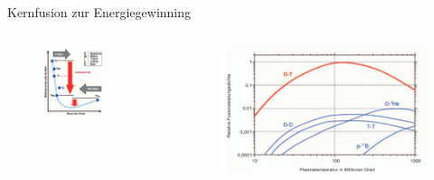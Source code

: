 \documentclass[aspectratio=169,xcolor=dvipsnames,14pt]{beamer}
\begin{document}
\begin{frame}{Kernfusion zur Energiegewinning}
    \begin{columns}
        \begin{column}{0.5\textwidth}
            \begin{figure}
                \centering
                \includegraphics[width=0.7\textwidth]{Images/Bindungsenergie.png}
            \end{figure}
        \end{column}

        \begin{column}{0.5\textwidth}
            \begin{figure}
                \centering
                \includegraphics[width=1\textwidth]{Images/Fusionsleistungsdichte.png}
            \end{figure}
        \end{column}
    \end{columns}
\end{frame}
\end{document}
